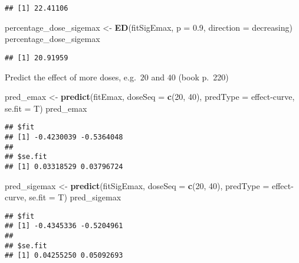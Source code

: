 \documentclass[
]{article}
\newenvironment{Shaded}{\begin{snugshade}}{\end{snugshade}}
\newcommand{\AttributeTok}[1]{\textcolor[rgb]{0.13,0.29,0.53}{#1}}
\newcommand{\DecValTok}[1]{\textcolor[rgb]{0.00,0.00,0.81}{#1}}
\newcommand{\FloatTok}[1]{\textcolor[rgb]{0.00,0.00,0.81}{#1}}
\newcommand{\FunctionTok}[1]{\textcolor[rgb]{0.13,0.29,0.53}{\textbf{#1}}}
\newcommand{\NormalTok}[1]{#1}
\newcommand{\OtherTok}[1]{\textcolor[rgb]{0.56,0.35,0.01}{#1}}
\newcommand{\StringTok}[1]{\textcolor[rgb]{0.31,0.60,0.02}{#1}}
\begin{document}
\begin{verbatim}
## [1] 22.41106
\end{verbatim}

\begin{Shaded}
\begin{Highlighting}[]
\NormalTok{percentage\_dose\_sigemax }\OtherTok{\textless{}{-}} \FunctionTok{ED}\NormalTok{(fitSigEmax, }\AttributeTok{p =} \FloatTok{0.9}\NormalTok{, }\AttributeTok{direction =} \StringTok{\textquotesingle{}decreasing\textquotesingle{}}\NormalTok{)}
\NormalTok{percentage\_dose\_sigemax}
\end{Highlighting}
\end{Shaded}

\begin{verbatim}
## [1] 20.91959
\end{verbatim}

Predict the effect of more doses, e.g.~\(20\) and \(40\) (book p.~220)

\begin{Shaded}
\begin{Highlighting}[]
\NormalTok{pred\_emax }\OtherTok{\textless{}{-}} \FunctionTok{predict}\NormalTok{(fitEmax, }\AttributeTok{doseSeq =} \FunctionTok{c}\NormalTok{(}\DecValTok{20}\NormalTok{, }\DecValTok{40}\NormalTok{), }\AttributeTok{predType =} \StringTok{\textquotesingle{}effect{-}curve\textquotesingle{}}\NormalTok{, }\AttributeTok{se.fit =}\NormalTok{ T)}
\NormalTok{pred\_emax}
\end{Highlighting}
\end{Shaded}

\begin{verbatim}
## $fit
## [1] -0.4230039 -0.5364048
## 
## $se.fit
## [1] 0.03318529 0.03796724
\end{verbatim}

\begin{Shaded}
\begin{Highlighting}[]
\NormalTok{pred\_sigemax }\OtherTok{\textless{}{-}} \FunctionTok{predict}\NormalTok{(fitSigEmax, }\AttributeTok{doseSeq =} \FunctionTok{c}\NormalTok{(}\DecValTok{20}\NormalTok{, }\DecValTok{40}\NormalTok{), }\AttributeTok{predType =} \StringTok{\textquotesingle{}effect{-}curve\textquotesingle{}}\NormalTok{, }\AttributeTok{se.fit =}\NormalTok{ T)}
\NormalTok{pred\_sigemax }
\end{Highlighting}
\end{Shaded}

\begin{verbatim}
## $fit
## [1] -0.4345336 -0.5204961
## 
## $se.fit
## [1] 0.04255250 0.05092693
\end{verbatim}
\end{document}
